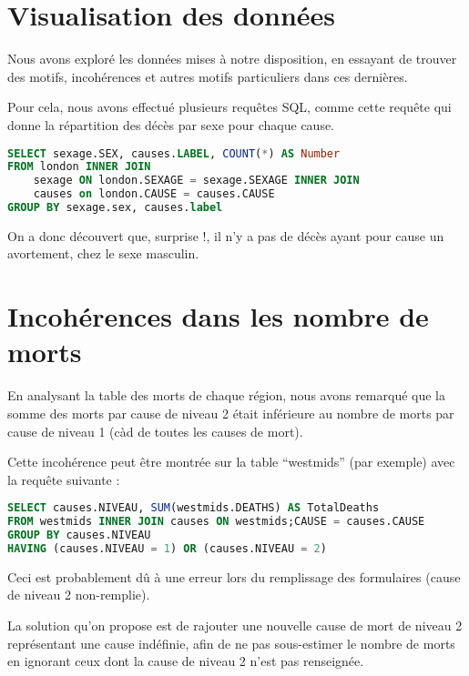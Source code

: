 \section{Visualisation des données}

    Nous avons exploré les données mises à notre disposition, en essayant de trouver des motifs, incohérences et autres motifs particuliers
    dans ces dernières.

    Pour cela, nous avons effectué plusieurs requêtes SQL, comme cette requête qui donne la répartition des décès par sexe pour chaque
    cause.

    \begin{lstlisting}[frame=single, language=SQL]
SELECT sexage.SEX, causes.LABEL, COUNT(*) AS Number
FROM london INNER JOIN
    sexage ON london.SEXAGE = sexage.SEXAGE INNER JOIN
    causes on london.CAUSE = causes.CAUSE
GROUP BY sexage.sex, causes.label
    \end{lstlisting}

    On a donc découvert que, surprise !, il n'y a pas de décès ayant pour cause un avortement, chez le sexe masculin.

\section{Incohérences dans les nombre de morts}

    En analysant la table des morts de chaque région, nous avons remarqué que la somme des morts par cause de niveau 2 était
    inférieure au nombre de morts par cause de niveau 1 (càd de toutes les causes de mort).

    Cette incohérence peut être montrée sur la table ``westmids'' (par exemple) avec la requête suivante :

    \begin{lstlisting}[frame=single, language=SQL]
SELECT causes.NIVEAU, SUM(westmids.DEATHS) AS TotalDeaths
FROM westmids INNER JOIN causes ON westmids;CAUSE = causes.CAUSE
GROUP BY causes.NIVEAU
HAVING (causes.NIVEAU = 1) OR (causes.NIVEAU = 2)
    \end{lstlisting}

    Ceci est probablement dû à une erreur lors du remplissage des formulaires (cause de niveau 2 non-remplie).

    La solution qu'on propose est de rajouter une nouvelle cause de mort de niveau 2 représentant une cause indéfinie, afin
    de ne pas sous-estimer le nombre de morts en ignorant ceux dont la cause de niveau 2 n'est pas renseignée.

